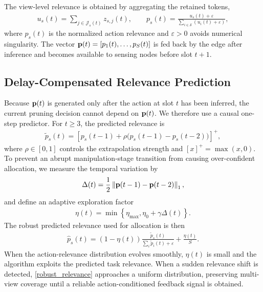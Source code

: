 \documentclass[lettersize,journal]{IEEEtran}
\theoremstyle{custom}
\begin{document}
The view-level relevance is obtained by aggregating the retained tokens,
\begin{align}
    u_s(t) = \sum_{j\in\mathcal{J}_s(t)} z_{s,j}(t), \qquad
    p_s(t) = \frac{u_s(t)+\varepsilon}{\sum_{i\in\mathcal{S}}(u_i(t)+\varepsilon)},
    \label{view_relevance}
\end{align}
where $p_s(t)$ is the normalized action relevance and $\varepsilon>0$ avoids numerical singularity. The vector ${\bf p}(t)=[p_1(t),\ldots,p_S(t)]$ is fed back by the edge after inference and becomes available to sensing nodes before slot $t+1$.

\subsection{Delay-Compensated Relevance Prediction}
Because ${\bf p}(t)$ is generated only after the action at slot $t$ has been inferred, the current pruning decision cannot depend on ${\bf p}(t)$. We therefore use a causal one-step predictor. For $t\geq 3$, the predicted relevance is
\begin{align}
    \widetilde p_s(t)
    = \left[p_s(t-1)+\rho\big(p_s(t-1)-p_s(t-2)\big)\right]^+,
    \label{relevance_predictor}
\end{align}
where $\rho\in[0,1]$ controls the extrapolation strength and $[x]^+=\max(x,0)$. To prevent an abrupt manipulation-stage transition from causing over-confident allocation, we measure the temporal variation by
\begin{align}
    \Delta(t)=\frac{1}{2}\left\|{\bf p}(t-1)-{\bf p}(t-2)\right\|_1,
    \label{transition_metric}
\end{align}
and define an adaptive exploration factor
\begin{align}
    \eta(t)=\min\left\{\eta_{\max},\eta_0+\gamma\Delta(t)\right\}.
    \label{exploration_factor}
\end{align}
The robust predicted relevance used for allocation is then
\begin{align}
    \widehat p_s(t)
    = (1-\eta(t))
    \frac{\widetilde p_s(t)}{\sum_i\widetilde p_i(t)+\varepsilon}
    +\frac{\eta(t)}{S}.
    \label{robust_relevance}
\end{align}
When the action-relevance distribution evolves smoothly, $\eta(t)$ is small and the algorithm exploits the predicted task relevance. When a sudden relevance shift is detected, \eqref{robust_relevance} approaches a uniform distribution, preserving multi-view coverage until a reliable action-conditioned feedback signal is obtained.
\end{document}
